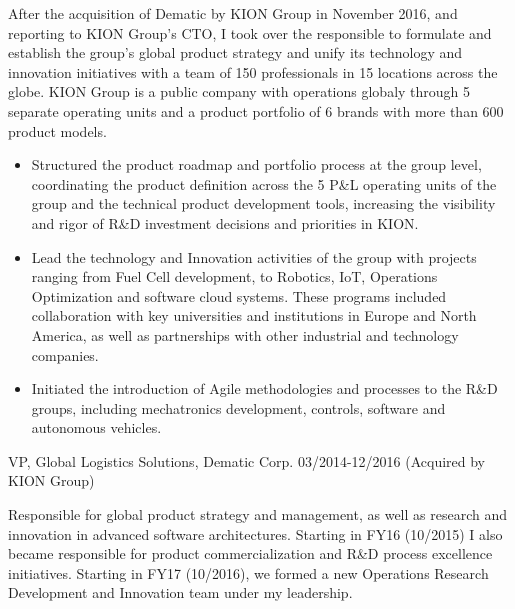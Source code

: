 \documentclass{res}
\begin{document}
\begin{resume}
After the acquisition of Dematic by KION Group in November 2016, and reporting to KION Group's CTO, I took over the responsible to formulate and establish the group's global product strategy and unify its technology and innovation initiatives with a team of 150 professionals in 15 locations across the globe. KION Group is a public company with operations globaly through 5 separate operating units and a product portfolio of 6 brands with more than 600 product models.
\begin{itemize}
    \item Structured the product roadmap and portfolio process at the group level, coordinating the product definition across the 5 P\&L operating units of the group and the technical product development tools, increasing the visibility and rigor of R\&D investment decisions and priorities in KION.
    \item Lead the technology and Innovation activities of the group with projects ranging from Fuel Cell development, to Robotics, IoT, Operations Optimization and software cloud systems. These programs included collaboration with key universities and institutions in Europe and North America, as well as partnerships with other industrial and technology companies.
    \item Initiated the introduction of Agile methodologies and processes to the R\&D groups, including mechatronics development, controls, software and autonomous vehicles.
\end{itemize}

\begin{bf}
VP, Global Logistics Solutions, Dematic Corp. 03/2014-12/2016
(Acquired by KION Group)
\end{bf}

Responsible for global product strategy and management, as well as research and innovation in advanced software architectures. Starting in FY16 (10/2015) I also became responsible for product commercialization and R\&D process excellence initiatives. Starting in FY17 (10/2016), we formed a new Operations Research Development and Innovation team under my leadership.


\end{resume}
\end{document}

